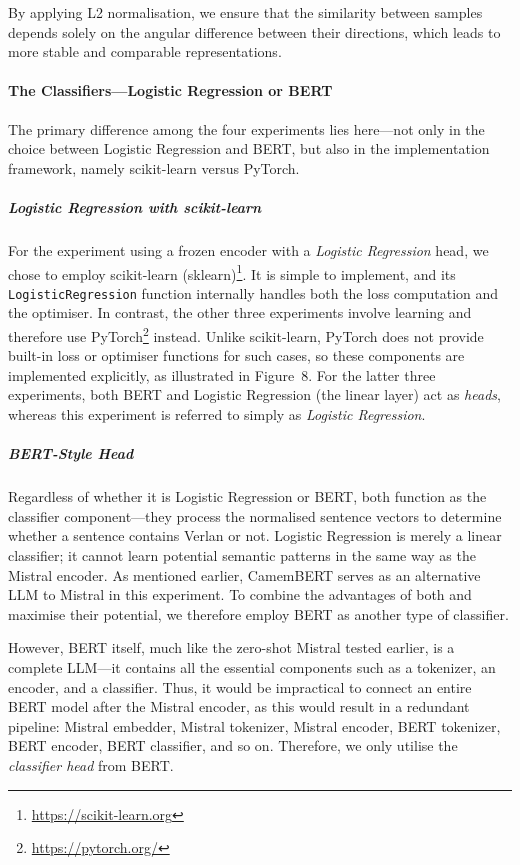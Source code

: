\documentclass[12pt]{article}
\begin{document}
By applying L2 normalisation, we ensure that the similarity between samples depends solely on the angular difference between their directions, which leads to more stable and comparable representations.

\paragraph{The Classifiers\;---\;Logistic Regression or BERT}
The primary difference among the four experiments lies here\;---\;not only in the choice between Logistic Regression and BERT, but also in the implementation framework, namely scikit-learn versus PyTorch.

\subparagraph{Logistic Regression with scikit-learn}
For the experiment using a frozen encoder with a \textit{Logistic Regression} head, we chose to employ scikit-learn (sklearn)\footnote{\url{https://scikit-learn.org}}. 
It is simple to implement, and its \texttt{LogisticRegression} function internally handles both the loss computation and the optimiser. 
In contrast, the other three experiments involve learning and therefore use PyTorch\footnote{\url{https://pytorch.org/}} instead. 
Unlike scikit-learn, PyTorch does not provide built-in loss or optimiser functions for such cases, so these components are implemented explicitly, as illustrated in Figure~8. 
For the latter three experiments, both BERT and Logistic Regression (the linear layer) act as \textit{heads}, whereas this experiment is referred to simply as \textit{Logistic Regression}.

\subparagraph{BERT-Style Head}
Regardless of whether it is Logistic Regression or BERT, both function as the classifier component\;---\;they process the normalised sentence vectors to determine whether a sentence contains Verlan or not. 
Logistic Regression is merely a linear classifier; it cannot learn potential semantic patterns in the same way as the Mistral encoder. 
As mentioned earlier, CamemBERT serves as an alternative LLM to Mistral in this experiment. 
To combine the advantages of both and maximise their potential, we therefore employ BERT as another type of classifier.

However, BERT itself, much like the zero-shot Mistral tested earlier, is a complete LLM\;---\;it contains all the essential components such as a tokenizer, an encoder, and a classifier. 
Thus, it would be impractical to connect an entire BERT model after the Mistral encoder, as this would result in a redundant pipeline: Mistral embedder, Mistral tokenizer, Mistral encoder, BERT tokenizer, BERT encoder, BERT classifier, and so on. 
Therefore, we only utilise the \textit{classifier head} from BERT.
\end{document}
